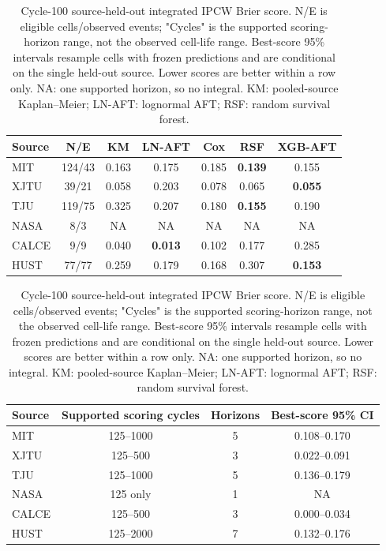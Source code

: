 \documentclass[preprint,12pt]{elsarticle}
\begin{document}
\begin{table}[htbp]\centering\small
\caption{Cycle-100 source-held-out integrated IPCW Brier score. N/E is eligible cells/observed events; "Cycles" is the supported scoring-horizon range, not the observed cell-life range. Best-score 95\% intervals resample cells with frozen predictions and are conditional on the single held-out source. Lower scores are better within a row only. NA: one supported horizon, so no integral. KM: pooled-source Kaplan--Meier; LN-AFT: lognormal AFT; RSF: random survival forest.}\label{tab:main}
\begin{tabular*}{\linewidth}{@{\extracolsep{\fill}}lcccccc}\toprule
Source & N/E & KM & LN-AFT & Cox & RSF & XGB-AFT \\\midrule
MIT &124/43&0.163&0.175&0.185&\textbf{0.139}&0.155\\
XJTU &39/21&0.058&0.203&0.078&0.065&\textbf{0.055}\\
TJU &119/75&0.325&0.207&0.180&\textbf{0.155}&0.190\\
NASA &8/3&NA&NA&NA&NA&NA\\
CALCE &9/9&0.040&\textbf{0.013}&0.102&0.177&0.285\\
HUST &77/77&0.259&0.179&0.168&0.307&\textbf{0.153}\\\bottomrule
\end{tabular*}
\vspace{2mm}

\begin{tabular*}{\linewidth}{@{\extracolsep{\fill}}lccc}\toprule
Source & Supported scoring cycles & Horizons & Best-score 95\% CI \\\midrule
MIT &125--1000&5&0.108--0.170\\
XJTU &125--500&3&0.022--0.091\\
TJU &125--1000&5&0.136--0.179\\
NASA &125 only&1&NA\\
CALCE &125--500&3&0.000--0.034\\
HUST &125--2000&7&0.132--0.176\\\bottomrule
\end{tabular*}
\end{table}
\end{document}
